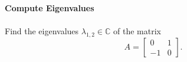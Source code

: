 \textbf{Compute Eigenvalues}\\
~\\
Find the eigenvalues $\lambda_{1,2} \in \mathbb{C}$ of the matrix
$$
A = \begin{bmatrix}
0&1\\
-1&0
\end{bmatrix}.
$$